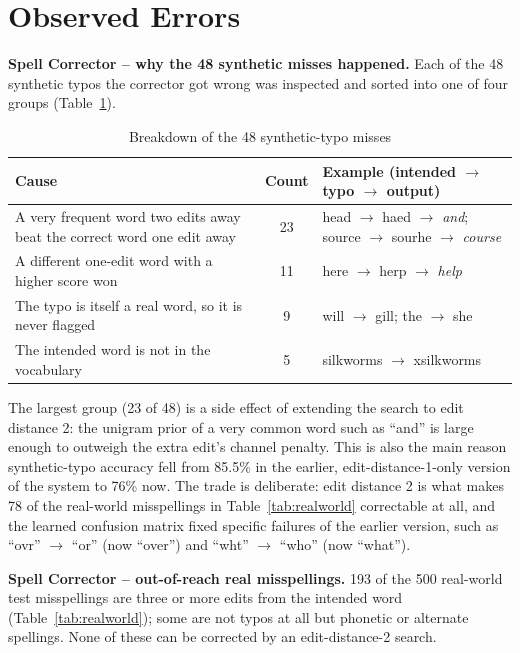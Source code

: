 \documentclass[12pt,a4paper]{report}
\begin{document}
\section{Observed Errors}

\textbf{Spell Corrector -- why the 48 synthetic misses happened.} Each
of the 48 synthetic typos the corrector got wrong was inspected and
sorted into one of four groups (Table~\ref{tab:spellerrors}).

\begin{table}[H]
\centering
\caption{Breakdown of the 48 synthetic-typo misses}
\label{tab:spellerrors}
\begin{tabular}{|>{\raggedright\arraybackslash}p{6.2cm}|c|>{\raggedright\arraybackslash}p{5cm}|}
\hline
\textbf{Cause} & \textbf{Count} & \textbf{Example (intended $\rightarrow$ typo $\rightarrow$ output)} \\
\hline
A very frequent word two edits away beat the correct word one edit away & 23 &
head $\rightarrow$ haed $\rightarrow$ \emph{and}; source $\rightarrow$ sourhe $\rightarrow$ \emph{course} \\
\hline
A different one-edit word with a higher score won & 11 &
here $\rightarrow$ herp $\rightarrow$ \emph{help} \\
\hline
The typo is itself a real word, so it is never flagged & 9 &
will $\rightarrow$ gill; the $\rightarrow$ she \\
\hline
The intended word is not in the vocabulary & 5 &
silkworms $\rightarrow$ xsilkworms \\
\hline
\end{tabular}
\end{table}

The largest group (23 of 48) is a side effect of extending the search to
edit distance 2: the unigram prior of a very common word such as
``and'' is large enough to outweigh the extra edit's channel penalty.
This is also the main reason synthetic-typo accuracy fell from 85.5\%
in the earlier, edit-distance-1-only version of the system to 76\% now.
The trade is deliberate: edit distance 2 is what makes 78 of the
real-world misspellings in Table~\ref{tab:realworld} correctable at
all, and the learned confusion matrix fixed specific failures of the
earlier version, such as ``ovr'' $\rightarrow$ ``or'' (now ``over'')
and ``wht'' $\rightarrow$ ``who'' (now ``what'').

\textbf{Spell Corrector -- out-of-reach real misspellings.} 193 of the
500 real-world test misspellings are three or more edits from the
intended word (Table~\ref{tab:realworld}); some are not typos at all
but phonetic or alternate spellings. None of these can be corrected by
an edit-distance-2 search.
\end{document}
